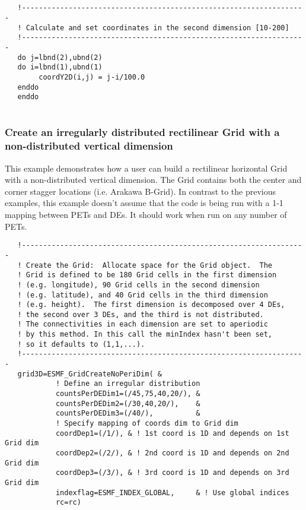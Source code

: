
 \begin{verbatim}


   !-------------------------------------------------------------------
   ! Calculate and set coordinates in the second dimension [10-200]
   !-------------------------------------------------------------------
   do j=lbnd(2),ubnd(2)
   do i=lbnd(1),ubnd(1)
        coordY2D(i,j) = j-i/100.0
   enddo
   enddo
 
\end{verbatim}
 

  \subsubsection{Create an irregularly distributed rectilinear Grid with
                  a non-distributed vertical dimension}
   \label{example:CurviGridWithUndistDim}
  
   This example demonstrates how a user can build a rectilinear
   horizontal Grid with a non-distributed vertical dimension. The Grid
   contains both the center and corner stagger locations (i.e. Arakawa
   B-Grid). In contrast to the previous examples, this example doesn't
   assume that the code is being run with a 1-1 mapping between
   PETs and DEs. It should work when run on any number of PETs.
   

 \begin{verbatim}
   !-------------------------------------------------------------------
   ! Create the Grid:  Allocate space for the Grid object.  The
   ! Grid is defined to be 180 Grid cells in the first dimension
   ! (e.g. longitude), 90 Grid cells in the second dimension
   ! (e.g. latitude), and 40 Grid cells in the third dimension
   ! (e.g. height).  The first dimension is decomposed over 4 DEs,
   ! the second over 3 DEs, and the third is not distributed.
   ! The connectivities in each dimension are set to aperiodic
   ! by this method. In this call the minIndex hasn't been set,
   ! so it defaults to (1,1,...).
   !-------------------------------------------------------------------
   grid3D=ESMF_GridCreateNoPeriDim( &
            ! Define an irregular distribution
            countsPerDEDim1=(/45,75,40,20/), &
            countsPerDEDim2=(/30,40,20/),    &
            countsPerDEDim3=(/40/),          &
            ! Specify mapping of coords dim to Grid dim
            coordDep1=(/1/), & ! 1st coord is 1D and depends on 1st Grid dim
            coordDep2=(/2/), & ! 2nd coord is 1D and depends on 2nd Grid dim
            coordDep3=(/3/), & ! 3rd coord is 1D and depends on 3rd Grid dim
            indexflag=ESMF_INDEX_GLOBAL,     & ! Use global indices
            rc=rc)
 
\end{verbatim}
 

